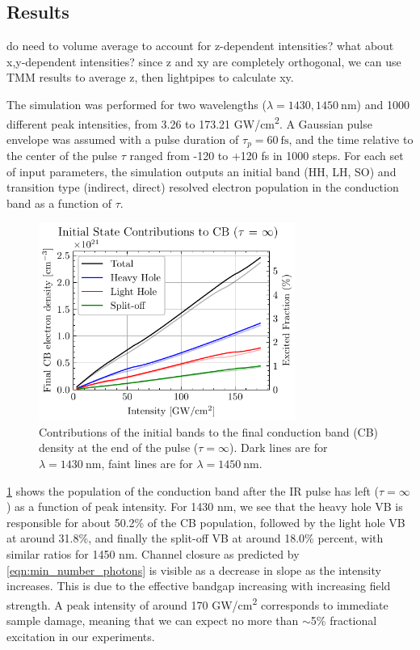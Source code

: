 \subsection{Results}

do need to volume average to account for z-dependent intensities? what about x,y-dependent intensities? since z and xy are completely orthogonal, we can use TMM results to average z, then lightpipes to calculate xy.

The simulation was performed for two wavelengths ($\lambda = 1430, 1450 \ \textrm{nm}$) and 1000 different peak intensities, from 3.26 to 173.21 GW/cm\textsuperscript{2}. A Gaussian pulse envelope was assumed with a pulse duration of $\tau_p = 60 \ \textrm{fs}$, and the time relative to the center of the pulse $\tau$ ranged from -120 to +120 fs in 1000 steps. For each set of input parameters, the simulation outputs an initial band (HH, LH, SO) and transition type (indirect, direct) resolved electron population in the conduction band as a function of $\tau$.

\begin{figure}
	\centering
	\includegraphics[width=0.75\textwidth]{figures/chap4/CB_dens_vs_Int.pdf}
	\caption{Contributions of the initial bands to the final conduction band (CB) density at the end of the pulse ($\tau = \infty$). Dark lines are for $\lambda = 1430 \ \textrm{nm}$, faint lines are for $\lambda = 1450 \ \textrm{nm}$.}
	\label{fig:CB_dens_vs_Int}
\end{figure}

\cref{fig:CB_dens_vs_Int} shows the population of the conduction band after the IR pulse has left ($\tau = \infty$) as a function of peak intensity. For 1430 nm, we see that the heavy hole VB is responsible for about 50.2\% of the CB population, followed by the light hole VB at around 31.8\%, and finally the split-off VB at around 18.0\% percent, with similar ratios for 1450 nm. Channel closure as predicted by \cref{eqn:min_number_photons} is visible as a decrease in slope as the intensity increases. This is due to the effective bandgap increasing with increasing field strength. A peak intensity of around 170 GW/cm\textsuperscript{2} corresponds to immediate sample damage, meaning that we can expect no more than $\sim$5\% fractional excitation in our experiments.

